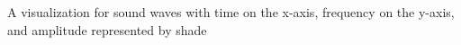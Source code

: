 A visualization for sound waves with time on the x-axis, frequency on the y-axis, and amplitude represented by shade
